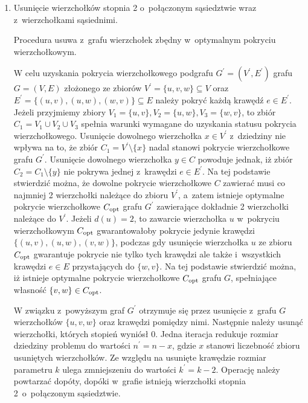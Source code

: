 \begin{enumerate}
  \item Usunięcie wierzchołków stopnia 2 o~połączonym sąsiedztwie wraz z~wierzchołkami sąsiednimi.   
    \begin{theorem}
      Procedura usuwa z~grafu wierzchołek zbędny w~optymalnym pokryciu wierzchołkowym.
    \end{theorem}
    \begin{bproof}
      W celu uzyskania pokrycia wierzchołkowego podgrafu $G^\prime=(V^\prime,E^\prime)$
      grafu $G=(V,E)$ złożonego ze zbiorów $ V^\prime=\{u, v, w\} \subseteq V$ oraz $E^\prime=\{(u,v), (u,w), (w,v)\} \subseteq E$ należy pokryć każdą krawędź $e \in E^\prime$.
      Jeżeli przyjmiemy zbiory ${V_1=\{u,v\}, V_2=\{u,w\}, V_3=\{w,v\}}$, to zbiór $C_1=V_1 \cup V_2 \cup V_3$ spełnia warunki wymagane do uzyskania 
      statusu pokrycia wierzchołkowego.
      Usunięcie dowolnego wierzchołka $x \in V^\prime$ z~dziedziny nie wpływa na to, że zbiór ${C_1=V^\prime \setminus \{x\}}$ nadal stanowi pokrycie wierzchołkowe grafu $G^\prime$.
      Usunięcie dowolnego wierzchołka $y \in C$ powoduje jednak, iż zbiór $C_2=C_1 \setminus \{y\}$ nie pokrywa jednej z~krawędzi $e \in E^\prime$.
      Na tej podstawie stwierdzić można, że dowolne pokrycie wierzchołkowe $C$ zawierać musi co najmniej 2 wierzchołki należące do zbioru $V^\prime$, a~zatem istnieje optymalne pokrycie wierzchołkowe $C_{\textnormal{opt}}$ grafu $G^\prime$ zawierające dokładnie 2 wierzchołki należące do $V^\prime$.
      Jeżeli $d(u)=2$, to zawarcie wierzchołka $u$ w~pokryciu wierzchołkowym $C_{\textnormal{opt}}$ gwarantowałoby pokrycie jedynie krawędzi $\{(u,v), (u,w), (v,w)\}$, podczas gdy usunięcie wierzchołka $u$ ze zbioru $C_{\textnormal{opt}}$ gwarantuje pokrycie nie tylko tych krawędzi ale także i~wszystkich krawędzi $e \in E$ przystających do $\{w, v\}$.
      Na tej podstawie stwierdzić można, iż istnieje optymalne pokrycie wierzchołkowe $C_{\textnormal{opt}}$ grafu $G$, spełniające własność $\{v,w\} \in C_{\textnormal{opt}}$.
    \end{bproof}
    W związku z~powyższym graf $G^\prime$ otrzymuje się przez usunięcie z~grafu $G$ wierzchołków $\{u,v,w\}$ oraz krawędzi pomiędzy nimi.
    Następnie należy usunąć wierzchołki, których stopień wyniósł 0.
    Jedna iteracja redukuje rozmiar dziedziny problemu do wartości $n^\prime=n-x$, gdzie $x$ stanowi liczebność zbioru usuniętych wierzchołków.
    Ze względu na usunięte krawędzie rozmiar parametru $k$ ulega zmniejszeniu do wartości $k^\prime=k-2$.
    Operację należy powtarzać dopóty, dopóki w~grafie istnieją wierzchołki stopnia 2\ o~połączonym sąsiedztwie.

\end{enumerate}
